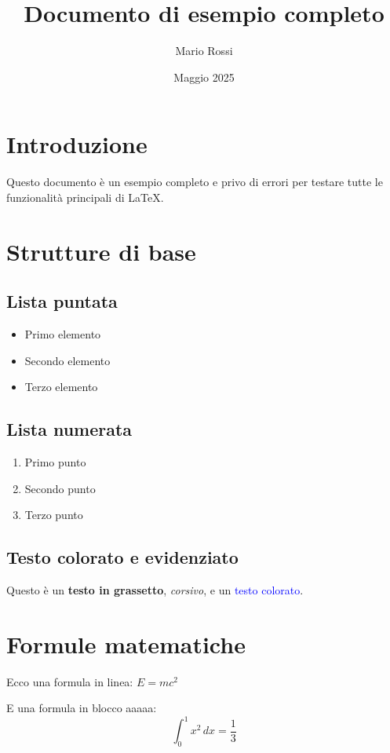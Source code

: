 \documentclass[a4paper,12pt]{article}
\title{Documento di esempio completo}
\author{Mario Rossi}
\date{Maggio 2025}
\begin{document}
\maketitle

\tableofcontents
\newpage

\section{Introduzione}
Questo documento è un esempio completo e privo di errori per testare tutte le funzionalità principali di \LaTeX.

\section{Strutture di base}

\subsection{Lista puntata}
\begin{itemize}
  \item Primo elemento
  \item Secondo elemento
  \item Terzo elemento
\end{itemize}

\subsection{Lista numerata}
\begin{enumerate}
  \item Primo punto
  \item Secondo punto
  \item Terzo punto
\end{enumerate}

\subsection{Testo colorato e evidenziato}
Questo è un \textbf{testo in grassetto}, \textit{corsivo}, e un \textcolor{blue}{testo colorato}.

\section{Formule matematiche}

Ecco una formula in linea: \( E = mc^2 \)

E una formula in blocco aaaaa:
\[
\int_0^1 x^2 \, dx = \frac{1}{3}
\]
\end{document}
